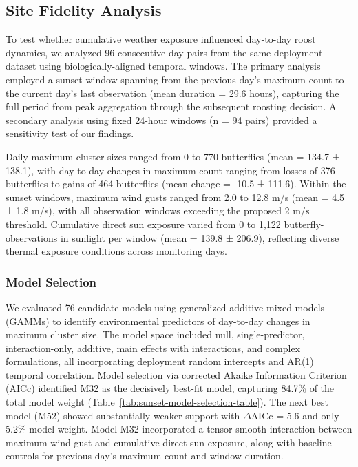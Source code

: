 

\subsection{Site Fidelity Analysis}

To test whether cumulative weather exposure influenced day-to-day roost dynamics, we analyzed 96 consecutive-day pairs from the same deployment dataset using biologically-aligned temporal windows. The primary analysis employed a sunset window spanning from the previous day's maximum count to the current day's last observation (mean duration = 29.6 hours), capturing the full period from peak aggregation through the subsequent roosting decision. A secondary analysis using fixed 24-hour windows (n = 94 pairs) provided a sensitivity test of our findings.

Daily maximum cluster sizes ranged from 0 to 770 butterflies (mean = 134.7 ± 138.1), with day-to-day changes in maximum count ranging from losses of 376 butterflies to gains of 464 butterflies (mean change = -10.5 ± 111.6). Within the sunset windows, maximum wind gusts ranged from 2.0 to 12.8 m/s (mean = 4.5 ± 1.8 m/s), with all observation windows exceeding the proposed 2 m/s threshold. Cumulative direct sun exposure varied from 0 to 1,122 butterfly-observations in sunlight per window (mean = 139.8 ± 206.9), reflecting diverse thermal exposure conditions across monitoring days.

\subsubsection{Model Selection}

We evaluated 76 candidate models using generalized additive mixed models (GAMMs) to identify environmental predictors of day-to-day changes in maximum cluster size. The model space included null, single-predictor, interaction-only, additive, main effects with interactions, and complex formulations, all incorporating deployment random intercepts and AR(1) temporal correlation. Model selection via corrected Akaike Information Criterion (AICc) identified M32 as the decisively best-fit model, capturing 84.7\% of the total model weight (Table~\ref{tab:sunset-model-selection-table}). The next best model (M52) showed substantially weaker support with $\Delta$AICc = 5.6 and only 5.2\% model weight. Model M32 incorporated a tensor smooth interaction between maximum wind gust and cumulative direct sun exposure, along with baseline controls for previous day's maximum count and window duration.

